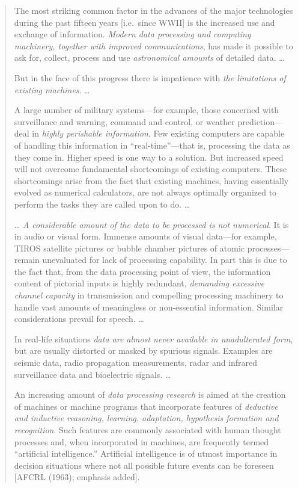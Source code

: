 \documentclass[
  letterpaper,
]{report}
\begin{document}
\begin{quote}
The most striking common factor in the advances of the major
technologies during the past fifteen years {[}i.e.~since WWII{]} is the
increased use and exchange of information. \emph{Modern data processing
and computing machinery, together with improved communications}, has
made it possible to ask for, collect, process and use \emph{astronomical
amounts} of detailed data. \ldots{}

But in the face of this progress there is impatience with \emph{the
limitations of existing machines}. \ldots{}

A large number of military systems---for example, those concerned with
surveillance and warning, command and control, or weather
prediction---deal in \emph{highly perishable information}. Few existing
computers are capable of handling this information in
``real-time''---that is, processing the data as they come in. Higher
speed is one way to a solution. But increased speed will not overcome
fundamental shortcomings of existing computers. These shortcomings arise
from the fact that existing machines, having essentially evolved as
numerical calculators, are not always optimally organized to perform the
tasks they are called upon to do. \ldots{}

\ldots{} \emph{A considerable amount of the data to be processed is not
numerical}. It is in audio or visual form. Immense amounts of visual
data---for example, TIROS satellite pictures or bubble chamber pictures
of atomic processes---remain unevaluated for lack of processing
capability. In part this is due to the fact that, from the data
processing point of view, the information content of pictorial inputs is
highly redundant, \emph{demanding excessive channel capacity} in
transmission and compelling processing machinery to handle vast amounts
of meaningless or non-essential information. Similar considerations
prevail for speech. \ldots{}

In real-life situations \emph{data are almost never available in
unadulterated form}, but are usually distorted or masked by spurious
signals. Examples are seismic data, radio propagation measurements,
radar and infrared surveillance data and bioelectric signals. \ldots{}

An increasing amount of \emph{data processing research} is aimed at the
creation of machines or machine programs that incorporate features of
\emph{deductive and inductive reasoning, learning, adaptation,
hypothesis formation and recognition}. Such features are commonly
associated with human thought processes and, when incorporated in
machines, are frequently termed ``artificial intelligence.'' Artificial
intelligence is of utmost importance in decision situations where not
all possible future events can be foreseen {[}AFCRL (1963); emphasis
added{]}.
\end{quote}
\end{document}
